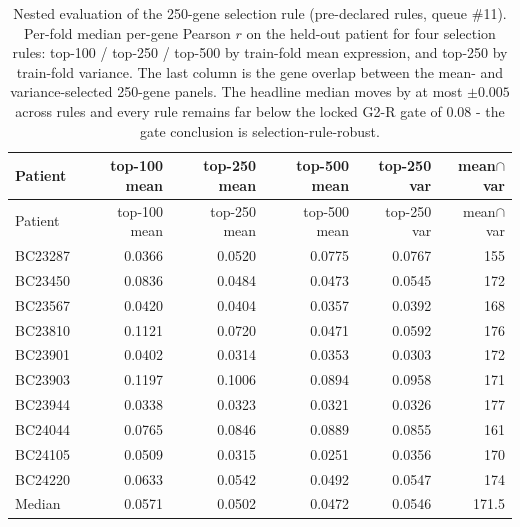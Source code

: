\begin{longtable}{lrrrrr}
\caption{Nested evaluation of the 250-gene selection rule (pre-declared rules, queue \#11).
Per-fold median per-gene Pearson $r$ on the held-out patient for four selection rules:
top-100 / top-250 / top-500 by train-fold mean expression, and top-250 by train-fold variance.
The last column is the gene overlap between the mean- and variance-selected 250-gene panels.
The headline median moves by at most $\pm 0.005$ across rules and every rule remains far below
the locked G2-R gate of $0.08$ - the gate conclusion is selection-rule-robust.}\label{tab:selection-sensitivity}\\
\toprule
Patient & top-100 mean & top-250 mean & top-500 mean & top-250 var & mean$\cap$var \\
\midrule
\endfirsthead
\toprule
Patient & top-100 mean & top-250 mean & top-500 mean & top-250 var & mean$\cap$var \\
\midrule
\endhead
BC23287 & 0.0366 & 0.0520 & 0.0775 & 0.0767 & 155 \\
BC23450 & 0.0836 & 0.0484 & 0.0473 & 0.0545 & 172 \\
BC23567 & 0.0420 & 0.0404 & 0.0357 & 0.0392 & 168 \\
BC23810 & 0.1121 & 0.0720 & 0.0471 & 0.0592 & 176 \\
BC23901 & 0.0402 & 0.0314 & 0.0353 & 0.0303 & 172 \\
BC23903 & 0.1197 & 0.1006 & 0.0894 & 0.0958 & 171 \\
BC23944 & 0.0338 & 0.0323 & 0.0321 & 0.0326 & 177 \\
BC24044 & 0.0765 & 0.0846 & 0.0889 & 0.0855 & 161 \\
BC24105 & 0.0509 & 0.0315 & 0.0251 & 0.0356 & 170 \\
BC24220 & 0.0633 & 0.0542 & 0.0492 & 0.0547 & 174 \\
\midrule
Median & 0.0571 & 0.0502 & 0.0472 & 0.0546 & 171.5 \\
\bottomrule
\end{longtable}
